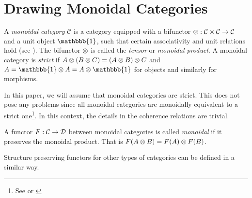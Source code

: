 \section{Drawing Monoidal Categories}
\label{sec:monoidal-cat}

\begin{definition}
    A \textit{monoidal category} $\mathcal{C}$ is a category equipped with a bifunctor $\otimes: \mathcal{C} \times \mathcal{C} \to \mathcal{C}$ and a unit object $\mathbbb{1}$, such that certain associativity and unit relations hold (see \cite[Definition 2.1.1, 2.2.8]{tensor-categories}). The bifunctor $\otimes$ is called the \textit{tensor} or \textit{monoidal product}. A monoidal category is \textit{strict} if $A \otimes (B \otimes C) = (A \otimes B) \otimes C$ and $A = \mathbbb{1} \tensor A = A \tensor \mathbbb{1}$ for objects and similarly for morphisms.
\end{definition}

In this paper, we will assume that monoidal categories are strict. This does not pose any problems since all monoidal categories are monoidally equivalent to a strict one\footnote{See \cite[\nopp VII.2]{maclane-category-theory} or \cite[Thm 2.8.5]{tensor-categories}}. In this context, the details in the coherence relations are trivial.

\begin{definition}
    A functor $F: \mathcal{C} \to \mathcal{D}$ between monoidal categories is called \textit{monoidal} if it preserves the monoidal product. That is $F(A \otimes B) = F(A) \otimes F(B)$.
\end{definition}

Structure preserving functors for other types of categories can be defined in a similar way.

